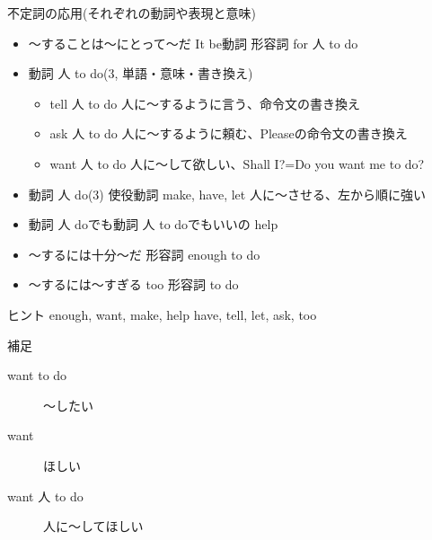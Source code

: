 \documentclass[10pt]{jsarticle}
\newcommand{\answer}[2]{{\color{orange}#2}}
\newcommand{\question}[2]{{\color{orange}#2}}
\newcommand{\answer}[2]{\vspace{#1mm}}
\newcommand{\question}[2]{#1}
\begin{document}
\begin{itembox}[l]{不定詞の応用(それぞれの動詞や表現と意味)}
	\begin{itemize}
		\item 〜することは〜にとって〜だ \answer{10}{It be動詞 形容詞 for 人 to do}
		\item 動詞 人 to do(3, 単語・意味・書き換え)\question{
			      \begin{itemize}
				      \item \item \item
			      \end{itemize}
		      }{
			      \begin{itemize}
				      \item tell 人 to do 人に〜するように言う、命令文の書き換え
				      \item ask 人 to do 人に〜するように頼む、Pleaseの命令文の書き換え
				      \item want 人 to do 人に〜して欲しい、Shall I?=Do you want me to do?
			      \end{itemize}

		      }
		\item 動詞 人 do(3)\question{
			      \begin{itemize}
				      \item \item \item
			      \end{itemize}
		      }{
			      使役動詞 make, have, let 人に〜させる、左から順に強い
		      }

		\item 動詞 人 doでも動詞 人 to doでもいいの \answer{10}{help}
		\item 〜するには十分〜だ \answer{5}{形容詞 enough to do}
		\item 〜するには〜すぎる \answer{5}{too 形容詞 to do}
	\end{itemize}
	\begin{itembox}[l]{ヒント}
		enough, want, make, help have, tell, let, ask, too
	\end{itembox}
\end{itembox}

\begin{itembox}[l]{補足}
	\begin{multicols}{3}
		\begin{description}
			\item[want to do] \answer{0}{〜したい}
				\item[want]\answer{0}{ほしい}
				\item[want 人 to do]\answer{0}{人に〜してほしい}
		\end{description}
	\end{multicols}
\end{itembox}
\end{document}
